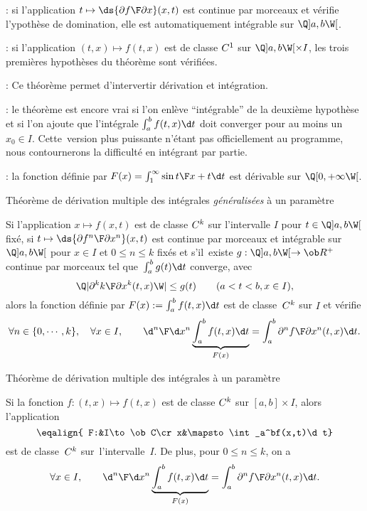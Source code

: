 \Remarque : si l'application $t\mapsto\ds{\partial f\F\partial x}(x,t)$ est continue par morceaux et v\'erifie l'ypoth\`ese de domination, elle est automatiquement int\'egrable sur $\Q]a,b\W[$. 
\bigskip

\Remarque : si l'application $(t,x)\mapsto f(t,x)$ est de classe $\sc C^1$ sur $\Q]a,b\W[\times I$, les trois premi\`eres hypoth\`eses du th\'eor\`eme sont v\'erifi\'ees. 
\bigskip

\Remarque : Ce th\'eor\`eme permet d'intervertir d\'erivation et int\'egration. 
\bigskip

\Remarque : le th\'eor\`eme est encore vrai si l'on enl\`eve ``int\'egrable'' de la deuxi\`eme hypoth\`ese et si l'on ajoute que l'int\'egrale $\int_a^bf(t,x)\d t$ doit converger pour au moins un $x_0\in I$. 
Cette~version plus puissante n'\'etant pas officiellement au programme, nous contournerons la difficult\'e en int\'egrant par partie. 
\bigskip

\Application : la fonction d\'efinie par $F(x)=\int_1^\infty{\sin t\F x+t}\d t$ est d\'erivable sur $\Q[0, +\infty\W[$. 

\Concept [Index=Theoreme@Th\'eor\`eme!de derivation des integrales a un parametre@de d\'erivation des int\'egrales \`a un param\`etre] Th\'eor\`eme de d\'erivation multiple des int\'egrales {\it g\'en\'eralis\'ees} \`a un param\`etre

Si l'application $x\mapsto f(x,t)$ est de classe $\sc C^k$ sur l'intervalle $I$ pour $t\in\Q]a,b\W[$ fix\'e, \pn
si $t\mapsto\ds{\partial f^n\F\partial x^n}(x,t)$ est continue par morceaux et int\'egrable sur $\Q]a,b\W[$ pour $x\in I$ et $0\le n\le k$ fix\'es et 
s'il~existe $g:\Q]a,b\W[\to\ob R^+$continue par morceaux tel que~$\int_a^bg(t)\d t$ converge, avec 
$$
\Q|{\partial^kk\F\partial x^k}(t,x)\W|\le g(t)\qquad(a<t<b, x\in I),
$$
alors la fonction d\'efinie par $F(x):=\int_a^bf(t,x)\d t$ est de classe~$\sc C^k$ sur $I$ et v\'erifie
$$
\forall n\in\{0, \cdots, k\}, \quad \forall x\in I, \qquad {\d^n\F\d x^n}\underbrace{\int_a^bf(t,x)\d t}_{F(x)}=\int_a^b{\partial^n f\F\partial x^n}(t,x)\d t. 
$$


\Concept [Index=Theoreme@Th\'eor\`eme!de derivation des integrales a un parametre@de d\'erivation des int\'egrales \`a un param\`etre] Th\'eor\`eme de d\'erivation multiple des int\'egrales \`a un param\`etre

Si la fonction $f:(t,x)\mapsto f(t,x)$ est de classe $\sc C^k$ sur $[a,b]\times I$, alors l'application 
$$
\eqalign{
F:&I\to\ob C\cr
x&\mapsto\int_a^bf(x,t)\d t}
$$
est de classe~$\sc C^k$ sur~l'intervalle~$I$. De plus, pour $0\le n\le k$, on a 
$$
\forall x\in I, \qquad {\d^n\F\d x^n}\underbrace{\int_a^bf(t,x)\d t}_{F(x)}=\int_a^b{\partial^n f\F\partial x^n}(t,x)\d t. 
$$

